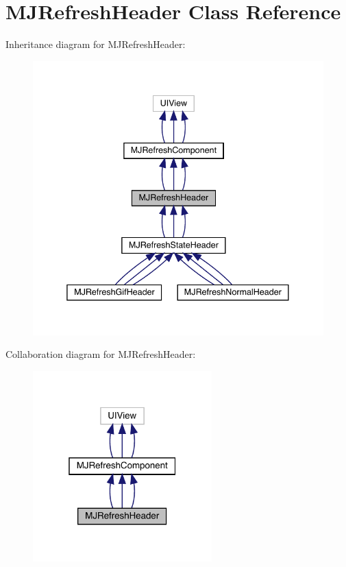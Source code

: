 \hypertarget{interface_m_j_refresh_header}{}\section{M\+J\+Refresh\+Header Class Reference}
\label{interface_m_j_refresh_header}


Inheritance diagram for M\+J\+Refresh\+Header\+:\nopagebreak
\begin{figure}[H]
\begin{center}
\leavevmode
\includegraphics[width=338pt]{interface_m_j_refresh_header__inherit__graph}
\end{center}
\end{figure}


Collaboration diagram for M\+J\+Refresh\+Header\+:\nopagebreak
\begin{figure}[H]
\begin{center}
\leavevmode
\includegraphics[width=196pt]{interface_m_j_refresh_header__coll__graph}
\end{center}
\end{figure}
